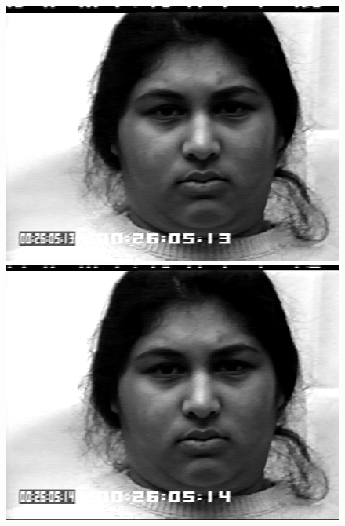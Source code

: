 \documentclass[12pt, a4paper]{scrbook}
\begin{document}
\begin{figure}[h]
	\begin{minipage}[b]{.2\linewidth} %
		\includegraphics[width=\linewidth]{Bilder/Disgust1.png}
	\end{minipage}
	\hspace{.025\linewidth}%
	\begin{minipage}[b]{.2\linewidth} %
		\includegraphics[width=\linewidth]{Bilder/Disgust2.png}
	\end{minipage}
	\hspace{.025\linewidth}%
	\begin{minipage}[b]{.2\linewidth} %

\end{minipage}
\end{figure}
\end{document}
